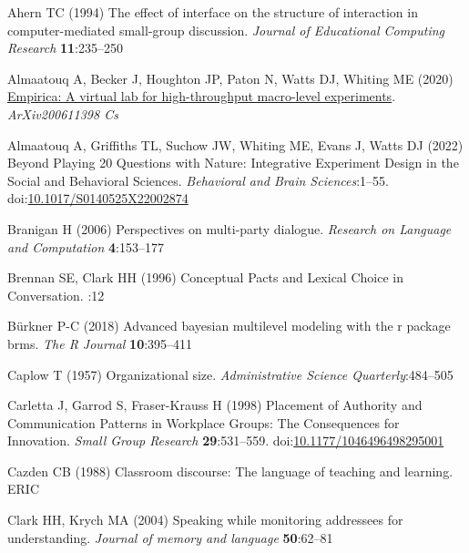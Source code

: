 \documentclass[
  english,
]{article}
\newlength{\cslhangindent}
\newlength{\cslentryspacingunit} %
\newenvironment{CSLReferences}[2] %
 {%
  \setlength{\parindent}{0pt}
  \ifodd #1
  \let\oldpar\par
  \def\par{\hangindent=\cslhangindent\oldpar}
  \fi
  \setlength{\parskip}{#2\cslentryspacingunit}
 }%
 {}
\begin{document}
\hypertarget{refs}{}
\begin{CSLReferences}{1}{0}
\leavevmode{}%
Ahern TC (1994) The effect of interface on the structure of interaction in computer-mediated small-group discussion. \emph{Journal of Educational Computing Research} \textbf{11}:235--250

\leavevmode{}%
Almaatouq A, Becker J, Houghton JP, Paton N, Watts DJ, Whiting ME (2020) \href{http://arxiv.org/abs/2006.11398}{Empirica: A virtual lab for high-throughput macro-level experiments}. \emph{ArXiv200611398 Cs}

\leavevmode{}%
Almaatouq A, Griffiths TL, Suchow JW, Whiting ME, Evans J, Watts DJ (2022) Beyond {Playing} 20 {Questions} with {Nature}: {Integrative Experiment Design} in the {Social} and {Behavioral Sciences}. \emph{Behavioral and Brain Sciences}:1--55. doi:\href{https://doi.org/10.1017/S0140525X22002874}{10.1017/S0140525X22002874}

\leavevmode{}%
Branigan H (2006) Perspectives on multi-party dialogue. \emph{Research on Language and Computation} \textbf{4}:153--177

\leavevmode{}%
Brennan SE, Clark HH (1996) Conceptual {Pacts} and {Lexical Choice} in {Conversation}. :12

\leavevmode{}%
Bürkner P-C (2018) Advanced bayesian multilevel modeling with the r package brms. \emph{The R Journal} \textbf{10}:395--411

\leavevmode{}%
Caplow T (1957) Organizational size. \emph{Administrative Science Quarterly}:484--505

\leavevmode{}%
Carletta J, Garrod S, Fraser-Krauss H (1998) Placement of {Authority} and {Communication Patterns} in {Workplace Groups}: {The Consequences} for {Innovation}. \emph{Small Group Research} \textbf{29}:531--559. doi:\href{https://doi.org/10.1177/1046496498295001}{10.1177/1046496498295001}

\leavevmode{}%
Cazden CB (1988) Classroom discourse: The language of teaching and learning. ERIC

\leavevmode{}%
Clark HH, Krych MA (2004) Speaking while monitoring addressees for understanding. \emph{Journal of memory and language} \textbf{50}:62--81


\end{CSLReferences}
\end{document}
